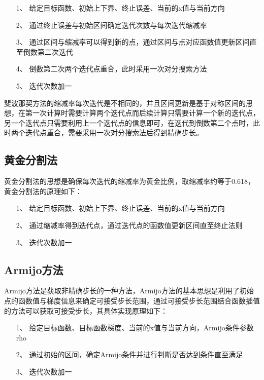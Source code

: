 \begin{itemize}
    \item[1、] 给定目标函数、初始上下界、终止误差、当前的x值与当前方向
    \item[2、] 通过终止误差与初始区间确定迭代次数与每次迭代缩减率
    \item[3、] 通过区间与缩减率可以得到新的点，通过区间与点对应函数值更新区间直至倒数第二次迭代
    \item[4、] 倒数第二次两个迭代点重合，此时采用一次对分搜索方法
    \item[5、] 迭代次数加一
\end{itemize}

斐波那契方法的缩减率每次迭代是不相同的，并且区间更新是基于对称区间的思想，在第一次计算时需要计算两个迭代点而后续计算只需要计算一个新的迭代点，另一个迭代点只需要利用上一个迭代点的信息即可，在迭代到倒数第二个点时，此时两个迭代点重合，需要采用一次对分搜索法后得到精确步长。

\subsection{黄金分割法}
黄金分割法的思想是确保每次迭代的缩减率为黄金比例，取缩减率约等于0.618，黄金分割法的原理如下：

\begin{itemize}
    \item[1、] 给定目标函数、初始上下界、终止误差、当前的x值与当前方向
    \item[2、] 通过缩减率得到迭代点，通过迭代点的函数值更新区间直至终止法则
    \item[3、] 迭代次数加一
\end{itemize}

\subsection{Armijo方法}
Armijo方法是获取非精确步长的一种方法，Armijo方法的基本思想是利用了初始点的函数值与梯度信息来确定可接受步长范围，通过可接受步长范围结合函数插值的方法可以获取可接受步长，其具体实现原理如下：

\begin{itemize}
    \item[1、] 给定目标函数、目标函数梯度、当前的x值与当前方向，Armijo条件参数rho
    \item[2、] 通过初始的区间，确定Armijo条件并进行判断是否达到条件直至满足
    \item[3、] 迭代次数加一
\end{itemize}

